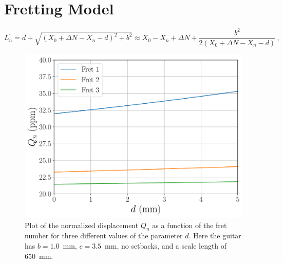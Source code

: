 %
%
%

 \section{Fretting Model\label{app:fret}}

 \begin{equation}
L^\prime_n = d + \sqrt{\left(X_0 + \Delta N - X_n - d\right)^2 + b^2} \approx X_0 - X_n + \Delta N + \frac{b^2}{2 \left(X_0 + \Delta N - X_n - d\right)}\, ,
 \end{equation}


 \begin{figure}
  \centering
  \includegraphics[width=6.0in]{figures/fret_model}
  \caption{\label{fig:fret_model} Plot of the normalized displacement $Q_n$ as a function of the fret number for three different values of the parameter $d$. Here the guitar has $b = 1.0$~mm, $c = 3.5$~mm, no setbacks, and a scale length of 650~mm.}
 \end{figure}



